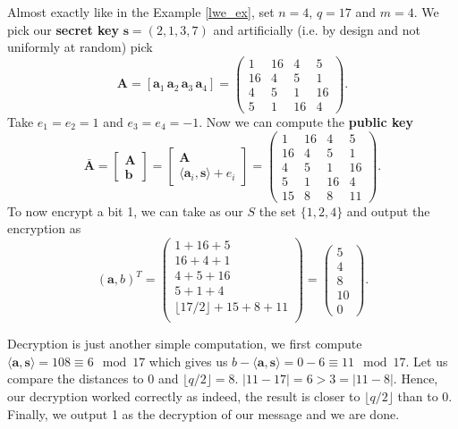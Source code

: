 \begin{example}
    Almost exactly like in the Example \ref{lwe_ex}, set $n = 4$, $q=17$ and $m=4$. We pick our \textbf{secret key} $\bm{s} = (2,1,3,7)$ and artificially (i.e. by design and not uniformly at random) pick
    \[ \bm{A} = [\bm{a}_1 \, \bm{a}_2 \, \bm{a}_3 \, \bm{a}_4] = 
	\begin{pmatrix}1 & 16 & 4 & 5\\
	    		16 & 4 & 5 & 1 \\
			4 & 5 & 1 & 16 \\
			5 & 1 & 16 & 4
	\end{pmatrix}. \]
	Take $e_1 = e_2 = 1$ and $e_3 = e_4 = -1$. Now we can compute the \textbf{public key} 
	\[ \bar{\bm{A}} = \begin{bmatrix} \bm{A} \\ \bm{b} \end{bmatrix} = 
	\begin{bmatrix} \bm{A} \\ \langle \bm{a}_i, \bm{s} \rangle + e_i \end{bmatrix}  = 
	\begin{pmatrix} 1 & 16 & 4 & 5 \\
	    16 & 4 & 5 & 1 \\
	    4 & 5 & 1 & 16 \\
	    5 & 1 & 16 & 4 \\
	    15 & 8 & 8 & 11
	\end{pmatrix}.
	\]
    To now encrypt a bit 1, we can take as our $S$ the set $\{1,2,4\}$ and output the encryption as
     \[(\bm{a}, b)^T = \begin{pmatrix} 1 + 16 + 5\\ 
		16 + 4 + 1\\
		4 + 5 + 16 \\
		5 + 1 + 4 \\
		\lfloor 17/2 \rfloor + 15 + 8 + 11 \\
		\end{pmatrix} = \begin{pmatrix} 5 \\ 4 \\ 8 \\ 10 \\ 0  \end{pmatrix}.
	    \]

	    Decryption is just another simple computation, we first compute $\langle \bm{a}, \bm{s} \rangle = 108 \equiv 6 \mod 17$ which gives us $b - \langle \bm{a}, \bm{s} \rangle = 0 - 6 \equiv 11 \mod 17$. Let us compare the distances to 0 and $\lfloor q/2 \rfloor = 8$. $|11 - 17| = 6 > 3 = |11 - 8|$. Hence, our decryption worked correctly as indeed, the result is closer to $\lfloor q/2 \rfloor$ than to 0. Finally, we output 1 as the decryption of our message and we are done.
\end{example}

